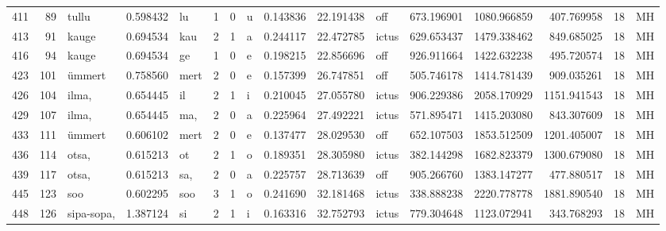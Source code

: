 \begin{tabular}{lrlrllllrrlrrrll}
411  &          89 &            tullu &  0.598432 &      lu &        1 &      0 &       u &      0.143836 &     22.191438 &    off &   673.196901 &  1080.966859 &   407.769958 &     18 &        MH \\
413  &          91 &            kauge &  0.694534 &     kau &        2 &      1 &       a &      0.244117 &     22.472785 &  ictus &   629.653437 &  1479.338462 &   849.685025 &     18 &        MH \\
416  &          94 &            kauge &  0.694534 &      ge &        1 &      0 &       e &      0.198215 &     22.856696 &    off &   926.911664 &  1422.632238 &   495.720574 &     18 &        MH \\
423  &         101 &           ümmert &  0.758560 &    mert &        2 &      0 &       e &      0.157399 &     26.747851 &    off &   505.746178 &  1414.781439 &   909.035261 &     18 &        MH \\
426  &         104 &            ilma, &  0.654445 &      il &        2 &      1 &       i &      0.210045 &     27.055780 &  ictus &   906.229386 &  2058.170929 &  1151.941543 &     18 &        MH \\
429  &         107 &            ilma, &  0.654445 &     ma, &        2 &      0 &       a &      0.225964 &     27.492221 &  ictus &   571.895471 &  1415.203080 &   843.307609 &     18 &        MH \\
433  &         111 &           ümmert &  0.606102 &    mert &        2 &      0 &       e &      0.137477 &     28.029530 &    off &   652.107503 &  1853.512509 &  1201.405007 &     18 &        MH \\
436  &         114 &            otsa, &  0.615213 &      ot &        2 &      1 &       o &      0.189351 &     28.305980 &  ictus &   382.144298 &  1682.823379 &  1300.679080 &     18 &        MH \\
439  &         117 &            otsa, &  0.615213 &     sa, &        2 &      0 &       a &      0.225757 &     28.713639 &    off &   905.266760 &  1383.147277 &   477.880517 &     18 &        MH \\
445  &         123 &              soo &  0.602295 &     soo &        3 &      1 &       o &      0.241690 &     32.181468 &  ictus &   338.888238 &  2220.778778 &  1881.890540 &     18 &        MH \\
448  &         126 &       sipa-sopa, &  1.387124 &      si &        2 &      1 &       i &      0.163316 &     32.752793 &  ictus &   779.304648 &  1123.072941 &   343.768293 &     18 &        MH \\

\end{tabular}
